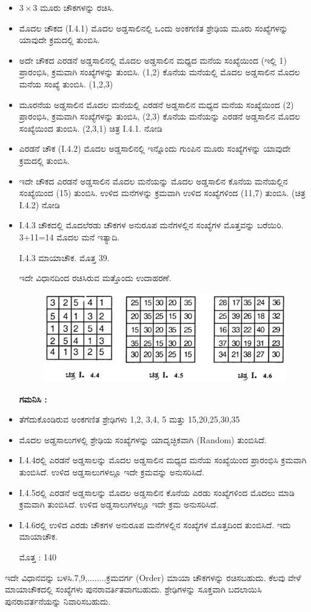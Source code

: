\begin{itemize}
	\item $3 \times 3$ ಮೂರು ಚೌಕಗಳನ್ನು ರಚಿಸಿ.
	\item ಮೊದಲ ಚೌಕದ (I.4.1) ಮೊದಲ ಅಡ್ಡಸಾಲಿನಲ್ಲಿ ಒಂದು ಅಂಕಗಣಿತ ಶ್ರೇಢಿಯ ಮೂರು ಸಂಖ್ಯೆಗಳನ್ನು ಯಾವುದೇ ಕ್ರಮದಲ್ಲಿ ತುಂಬಿಸಿ.
	\item ಅದೇ ಚೌಕದ ಎರಡನೆ ಅಡ್ಡಸಾಲಿನಲ್ಲಿ ಮೊದಲ ಅಡ್ಡಸಾಲಿನ ಮಧ್ಯದ ಮನೆಯ \break ಸಂಖ್ಯೆಯಿಂದ (ಇಲ್ಲಿ 1) ಪ್ರಾರಂಭಿಸಿ, ಕ್ರಮವಾಗಿ ಸಂಖ್ಯೆಗಳನ್ನು ತುಂಬಿಸಿ. (1,2) ಕೊನೆಯ ಮನೆಯಲ್ಲಿ ಮೊದಲ ಅಡ್ಡಸಾಲಿನ ಮೊದಲ ಮನೆಯ ಸಂಖ್ಯೆ ತುಂಬಿಸಿ. (1,2,3)
	\item ಮೂರನೆಯ ಅಡ್ಡಸಾಲಿನ ಮೊದಲ ಮನೆಯಲ್ಲಿ ಎರಡನೆ ಅಡ್ಡಸಾಲಿನ ಮಧ್ಯದ ಮನೆಯ ಸಂಖ್ಯೆಯಿಂದ (2) ಪ್ರಾರಂಭಿಸಿ, ಕ್ರಮವಾಗಿ ಸಂಖ್ಯೆಗಳನ್ನು ತುಂಬಿಸಿ, (2,3) ಕೊನೆಯ ಮನೆಯನ್ನು ಎರಡನೆ ಅಡ್ಡಸಾಲಿನ ಮೊದಲ ಸಂಖ್ಯೆಯಿಂದ \break ತುಂಬಿಸಿ. (2,3,1) ಚಿತ್ರ I.4.1. ನೋಡಿ
	\item ಎರಡನೆ ಚೌಕ (I.4.2) ಮೊದಲ ಅಡ್ಡಸಾಲಿನಲ್ಲಿ ಇನ್ನೊಂದು ಗುಂಪಿನ ಮೂರು \break ಸಂಖ್ಯೆಗಳನ್ನು ಯಾವುದೇ ಕ್ರಮದಲ್ಲಿ ತುಂಬಿಸಿ.
	\item ಇದೇ ಚೌಕದ ಎರಡನೆ ಅಡ್ಡಸಾಲಿನ ಮೊದಲ ಮನೆಯನ್ನು ಮೊದಲ ಅಡ್ಡಸಾಲಿನ \break ಕೊನೆಯ ಮನೆಯಲ್ಲಿನ ಸಂಖ್ಯೆಯಿಂದ (15) ತುಂಬಿಸಿ. ಉಳಿದ ಮನೆಗಳನ್ನು ಕ್ರಮವಾಗಿ ಉಳಿದ ಸಂಖ್ಯೆಗಳಿಂದ (11,7) ತುಂಬಿಸಿ. (ಚಿತ್ರ I.4.2) ನೋಡಿ
	\item I.4.3 ಚೌಕದಲ್ಲಿ ಮೊದಲೆರಡು ಚೌಕಗಳ ಅನುರೂಪ ಮನೆಗಳಲ್ಲಿನ ಸಂಖ್ಯೆಗಳ \break ಮೊತ್ತವನ್ನು ಬರೆಯಿರಿ. 3+11=14 ಮೊದಲ ಮನೆ ಇತ್ಯಾದಿ.

	I.4.3 ಮಾಯಾಚೌಕ. ಮೊತ್ತ 39.

	ಇದೇ ವಿಧಾನದಿಂದ ರಚಿಸಿರುವ ಮತ್ತೊಂದು ಉದಾಹರಣೆ.
	\begin{figure}[H]
	\includegraphics[scale=.9]{src/figures/chap3/fig3-10.jpg}
	\end{figure}

	\textbf{ಗಮನಿಸಿ :}
	\item ತೆಗೆದುಕೊಂಡಿರುವ ಅಂಕಗಣಿತ ಶ್ರೇಢಿಗಳು 1,2, 3,4, 5 ಮತ್ತು 15,20,25,30,35
	\item ಮೊದಲ ಅಡ್ಡಸಾಲುಗಳಲ್ಲಿ ಶ್ರೇಢಿಯ ಸಂಖ್ಯೆಗಳನ್ನು ಯಾದೃಚ್ಛಿಕವಾಗಿ (Random) ತುಂಬಿಸಿದೆ.
	\item I.4.4ರಲ್ಲಿ ಎರಡನೆ ಅಡ್ಡಸಾಲನ್ನು ಮೊದಲ ಅಡ್ಡಸಾಲಿನ ಮಧ್ಯದ ಮನೆಯ ಸಂಖ್ಯೆಯಿಂದ ಪ್ರಾರಂಭಿಸಿ ಕ್ರಮವಾಗಿ ತುಂಬಿಸಿದೆ. ಉಳಿದ ಅಡ್ಡಸಾಲುಗಳಲ್ಲೂ ಇದೇ ಕ್ರಮ\-ವನ್ನು ಅನುಸರಿಸಿದೆ.
	\item I.4.5ರಲ್ಲಿ ಎರಡನೆ ಅಡ್ಡಸಾಲನ್ನು ಮೊದಲ ಅಡ್ಡಸಾಲಿನ ಕೊನೆಯ ಎರಡು ಸಂಖ್ಯೆ\-ಗಳಿಂದ ಮೊದಲು ಮಾಡಿ ಕ್ರಮವಾಗಿ ತುಂಬಿಸಿದೆ. ಉಳಿದ ಅಡ್ಡಸಾಲುಗಳಲ್ಲೂ ಇದೇ ಕ್ರಮ ಅನುಸರಿಸಿದೆ.
	\item I.4.6ರಲ್ಲಿ ಉಳಿದ ಎರಡು ಚೌಕಗಳ ಅನುರೂಪ ಮನೆಗಳಲ್ಲಿನ ಸಂಖ್ಯೆಗಳ ಮೊತ್ತದಿಂದ ತುಂಬಿಸಿದೆ. ಇದು ಮಾಯಾಚೌಕ.

	ಮೊತ್ತ : 140
\end{itemize}
ಇದೇ ವಿಧಾನವನ್ನು ಬಳಸಿ.7,9,........ಕ್ರಮವರ್ಗ (Order) ಮಾಯಾ ಚೌಕಗಳನ್ನು ರಚಿಸ\-ಬಹುದು. ಕೆಲವು ವೇಳೆ ಮಾಯಾಚೌಕದಲ್ಲಿ ಸಂಖ್ಯೆಗಳು ಪುನರಾವರ್ತಿತವಾಗಬಹುದು.  ಶ್ರೇಢಿ\-ಗಳನ್ನು ಸೂಕ್ತವಾಗಿ ಬದಲಾಯಿಸಿ ಪುನರಾವರ್ತನೆಯನ್ನು ನಿವಾರಿಸಬಹುದು.

